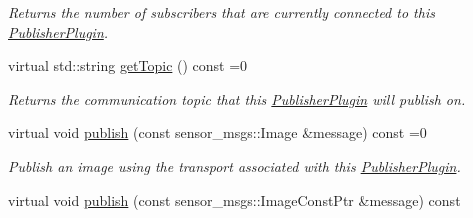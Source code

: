 \begin{DoxyCompactItemize}
\begin{DoxyCompactList}\small\item\em Returns the number of subscribers that are currently connected to this \hyperlink{classimage__transport_1_1_publisher_plugin}{Publisher\-Plugin}. \end{DoxyCompactList}\item 
\hypertarget{classimage__transport_1_1_publisher_plugin_ac00807561a7e3406472273b85f1036e8}{virtual std\-::string \hyperlink{classimage__transport_1_1_publisher_plugin_ac00807561a7e3406472273b85f1036e8}{get\-Topic} () const =0}\label{classimage__transport_1_1_publisher_plugin_ac00807561a7e3406472273b85f1036e8}

\begin{DoxyCompactList}\small\item\em Returns the communication topic that this \hyperlink{classimage__transport_1_1_publisher_plugin}{Publisher\-Plugin} will publish on. \end{DoxyCompactList}\item 
\hypertarget{classimage__transport_1_1_publisher_plugin_a9c17e85717c5478011c944998d9f1bff}{virtual void \hyperlink{classimage__transport_1_1_publisher_plugin_a9c17e85717c5478011c944998d9f1bff}{publish} (const sensor\-\_\-msgs\-::\-Image \&message) const =0}\label{classimage__transport_1_1_publisher_plugin_a9c17e85717c5478011c944998d9f1bff}

\begin{DoxyCompactList}\small\item\em Publish an image using the transport associated with this \hyperlink{classimage__transport_1_1_publisher_plugin}{Publisher\-Plugin}. \end{DoxyCompactList}\item 
\hypertarget{classimage__transport_1_1_publisher_plugin_a5ec0ad17a8f0ef7b966089c3b8f6ee60}{virtual void \hyperlink{classimage__transport_1_1_publisher_plugin_a5ec0ad17a8f0ef7b966089c3b8f6ee60}{publish} (const sensor\-\_\-msgs\-::\-Image\-Const\-Ptr \&message) const }\label{classimage__transport_1_1_publisher_plugin_a5ec0ad17a8f0ef7b966089c3b8f6ee60}


\end{DoxyCompactItemize}
